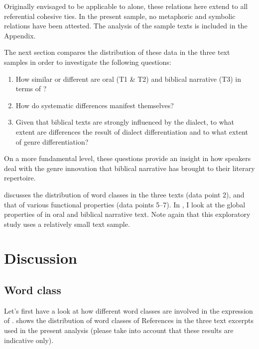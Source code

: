 \documentclass[output=paper
,modfonts
,nonflat]{langsci/langscibook}
\begin{document}
\noindent
Originally envisaged to be applicable to  alone, these relations here extend to all referential cohesive ties. In the present sample, no metaphoric and symbolic relations have been attested. The  analysis of the sample texts is included in the Appendix.

The next section compares the distribution of these data in the three text samples in order to investigate the following questions: 

\begin{enumerate}
	\item How similar or different are oral (T1 \& T2) and biblical narrative (T3) in terms of ?
	\item How do systematic differences manifest themselves?
	\item Given that biblical texts are strongly influenced by the  dialect, to what extent are differences the result of dialect differentiation and to what extent of genre differentiation?
\end{enumerate}

\noindent
On a more fundamental level, these questions provide an insight in how  speakers deal with the genre innovation that biblical narrative has brought to their literary repertoire. 

 discusses the distribution of word classes in the three texts (data point 2), and  that of various functional properties (data points 5--7). In , I look at the global properties of  in oral and biblical narrative text. Note again that this exploratory study uses a relatively small text sample.

\section{\label{s3}Discussion}

\subsection{\label{s3.1}Word class}

Let’s first have a look at how different word classes are involved in the expression of .  shows the distribution of word classes of References in the three text excerpts used in the present analysis (please take into account that these results are indicative only).
\end{document}
